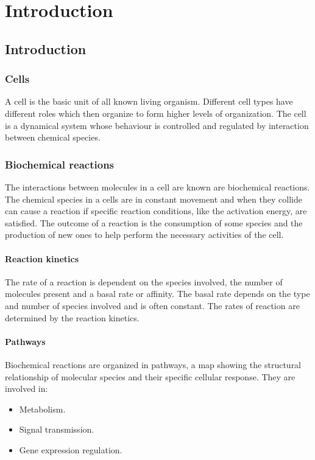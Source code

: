 \graphicspath{{chapters/01/images/}}
\chapter{Introduction}

\section{Introduction}

  \subsection{Cells}
  A cell is the basic unit of all known living organism.
  Different cell types have different roles which then organize to form higher levels of organization.
  The cell is a dynamical system whose behaviour is controlled and regulated by interaction between chemical species.

  \subsection{Biochemical reactions}
  The interactions between molecules in a cell are known are biochemical reactions.
  The chemical species in a cells are in constant movement and when they collide can cause a reaction if specific reaction conditions, like the activation energy, are satisfied.
  The outcome of a reaction is the consumption of some species and the production of new ones to help perform the necessary activities of the cell.

    \subsubsection{Reaction kinetics}
    The rate of a reaction is dependent on the species involved, the number of molecules present and a basal rate or affinity.
    The basal rate depends on the type and number of species involved and is often constant.
    The rates of reaction are determined by the reaction kinetics.

    \subsubsection{Pathways}
    Biochemical reactions are organized in pathways, a map showing the structural relationship of molecular species and their specific cellular response.
    They are involved in:

    \begin{multicols}{2}
      \begin{itemize}
        \item Metabolism.
        \item Signal transmission.
        \item Gene expression regulation.
      \end{itemize}
    \end{multicols}

